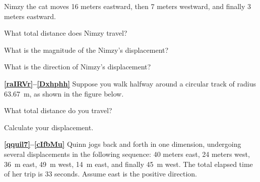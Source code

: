 \documentclass[../main.tex]{subfiles}
\begin{document}
\cyanhrule

\vspace{1em}

Nimzy the cat moves 16 meters eastward, then 7 meters westward, and finally 3 meters eastward.

\begin{exercise} \label{umzXid}
    What total distance does Nimzy travel?
\end{exercise}

\begin{exercise} \label{CO3yuB}
    What is the magnitude of the Nimzy's displacement?
\end{exercise}

\begin{exercise} \label{2O3f3z}
    What is the direction of Nimzy's displacement?
\end{exercise}

\cyanhrule

\vspace{1em}

\textbf{\ref{raIRVr}--\ref{Dxhphh}} Suppose you walk halfway around a circular track of radius \SI{63.67}{m}, as shown in the figure below.

\begin{center}
\end{center}

\begin{exercise} \label{raIRVr}
    What total distance do you travel?
\end{exercise}

\begin{exercise} \label{Dxhphh}
    Calculate your displacement.
\end{exercise}


\textbf{\ref{qquil7}--\ref{cIfbMu}} Quinn jogs back and forth in one dimension, undergoing several displacements in the following sequence: 40 meters east, 24 meters west, \SI{36}{m} east, \SI{49}{m} west, \SI{14}{m} east, and finally \SI{45}{m} west. The total elapsed time of her trip is 33 seconds. Assume east is the positive direction.
\end{document}
